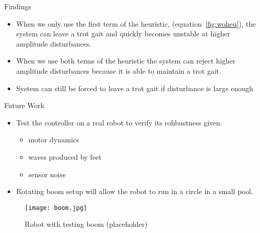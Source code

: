 \textcolor{prime}{\textsf{Findings}} \\
\begin{itemize}
\item When we only use the first term of the heuristic, (equation~\ref{fig:woheu}),  the system can leave a trot gait and quickly becomes unstable at higher amplitude disturbances.

\item When we use both terms of the heuristic the system can reject higher amplitude disturbances because it is able to maintain a trot gait. 

\item System can still be forced to leave a trot gait if disturbance is large enough
\end{itemize}

\vspace{2EX}
\textcolor{prime}{\textsf{Future Work}} \\
\begin{itemize}
	\item Test the controller on a real robot to verify its rohbustness given:
	\begin{itemize}
		\item motor dynamics
		\item waves produced by feet
		\item sensor noise
	\end{itemize}
	\item Rotating boom setup will allow the robot to run in a circle in a small pool. 
\end{itemize}

\vspace{2EX}
\begin{figure}[htb]
    \centering
	\texttt{[image: boom.jpg]}
    \caption{Robot with testing boom (placeholder)}
\end{figure}
\vspace{-1in}
